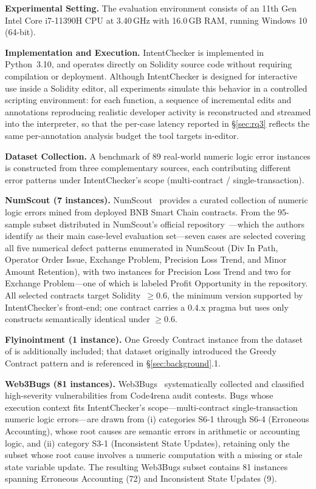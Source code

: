 \documentclass[pdflatex,sn-basic]{sn-jnl}%
\theoremstyle{thmstyleone}%
\theoremstyle{thmstyletwo}%
\theoremstyle{thmstylethree}%
\begin{document}
\noindent\textbf{Experimental Setting.}
The evaluation environment consists of an 11th Gen Intel\textregistered{} Core\texttrademark{}
i7-11390H CPU at 3.40\,GHz with 16.0\,GB RAM, running Windows 10 (64-bit).

\smallskip
\noindent\textbf{Implementation and Execution.}
IntentChecker is implemented in Python~3.10, and operates directly on Solidity source code without requiring compilation or deployment.
Although IntentChecker is designed for interactive use inside a Solidity editor, all experiments simulate this behavior in a controlled scripting environment: for each function, a sequence of incremental edits and annotations reproducing realistic developer activity is reconstructed and streamed into the interpreter, so that the per-case latency reported in \S\ref{sec:rq3} reflects the same per-annotation analysis budget the tool targets in-editor.

\smallskip
\noindent\textbf{Dataset Collection.}
A benchmark of 89 real-world numeric logic error instances is constructed from three complementary sources, each contributing different error patterns under IntentChecker's scope (multi-contract / single-transaction).

\smallskip\noindent\textbf{NumScout (7 instances).}
NumScout~\citep{numscout} provides a curated collection of numeric logic errors mined from deployed BNB Smart Chain contracts.
From the 95-sample subset distributed in NumScout's official repository~\citep{numscout_dataset}---which the authors identify as their main case-level evaluation set---seven cases are selected covering all five numerical defect patterns enumerated in NumScout (Div In Path, Operator Order Issue, Exchange Problem, Precision Loss Trend, and Minor Amount Retention), with two instances for Precision Loss Trend and two for Exchange Problem---one of which is labeled Profit Opportunity in the repository.
All selected contracts target Solidity~$\geq$0.6, the minimum version supported by IntentChecker's front-end; one contract carries a 0.4.x pragma but uses only constructs semantically identical under $\geq$0.6.

\smallskip\noindent\textbf{Flyinointment (1 instance).}
One Greedy Contract instance from the dataset of \citet{flyinointment} is additionally included; that dataset originally introduced the Greedy Contract pattern and is referenced in §\ref{sec:background}.1.

\smallskip\noindent\textbf{Web3Bugs (81 instances).}
Web3Bugs~\citep{exploitablebugs} systematically collected and classified high-severity vulnerabilities from Code4rena audit contests.
Bugs whose execution context fits IntentChecker's scope---multi-contract single-transaction numeric logic errors---are drawn from (i) categories S6-1 through S6-4 (Erroneous Accounting), whose root causes are semantic errors in arithmetic or accounting logic, and (ii) category S3-1 (Inconsistent State Updates), retaining only the subset whose root cause involves a numeric computation with a missing or stale state variable update.
The resulting Web3Bugs subset contains 81 instances spanning Erroneous Accounting (72) and Inconsistent State Updates (9).
\end{document}
